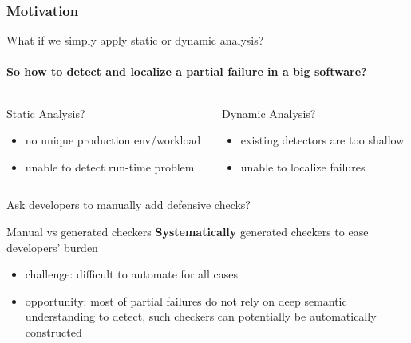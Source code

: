 \documentclass[aspectratio=169]{beamer}
\begin{document}
\begin{frame}
    \frametitle{Motivation}
    What if we simply apply static or dynamic analysis?
    \framesubtitle{So how to detect and localize a partial failure in a big software?}
    \begin{columns}
        \begin{column}{.5\textwidth}


            \begin{block}{Static Analysis?}
                \begin{itemize}
                    \item no unique production env/workload
                    \item unable to detect run-time problem
                \end{itemize}
            \end{block}



        \end{column}

        \begin{column}{.48\textwidth}
            \begin{block}{Dynamic Analysis?}
                \begin{itemize}
                    \item existing detectors are too shallow
                    \item unable to  localize failures
                \end{itemize}
            \end{block}
        \end{column}
    \end{columns}

    \vspace{1em}

    Ask developers to manually add defensive checks?

    \begin{block}{Manual vs generated checkers}
        \textbf{Systematically} generated checkers to ease developers’ burden
        \begin{itemize}
            \item challenge: difficult to automate for all cases
            \item opportunity: most of partial failures do not rely on deep semantic understanding
                  to detect, such checkers can potentially be automatically constructed
        \end{itemize}
    \end{block}
\end{frame}
\end{document}
